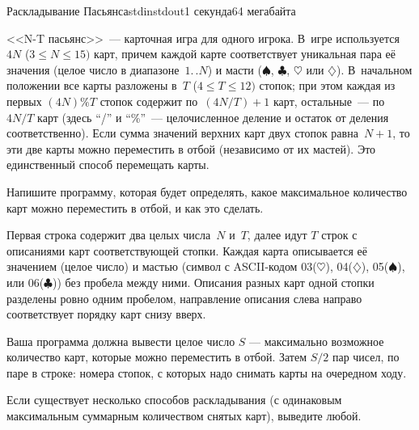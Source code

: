 \begin{problem}{Раскладывание Пасьянса}{stdin}{stdout}{1 секунда}{64 мегабайта}

<<N-T пасьянс>>~--- карточная игра для одного игрока. В~игре используется $4N$ 
($3\leqslant N\leqslant 15)$ карт, причем
каждой карте соответствует уникальная пара её значения (целое число 
в диапазоне~$1.\,.N$) и масти ($\spadesuit$, $\clubsuit$, $\heartsuit$
или $\diamondsuit$). В~начальном положении все карты разложены в~$T$ 
($4\leqslant T\leqslant 12)$ стопок; при этом каждая из первых
$(4N)\%T$ стопок содержит по~$(4N/T)+1$ карт, остальные~--- 
по~$4N/T$ карт (здесь ``/'' и ``\%''~--- целочисленное деление и 
остаток от деления соответственно). Если сумма значений верхних карт
двух стопок равна~$N+1$, то эти две карты можно переместить в отбой 
(независимо от их мастей). Это единственный способ перемещать карты.

Напишите программу, которая будет определять, какое максимальное
количество карт можно переместить в отбой, и как это сделать. 


\InputFile
Первая строка содержит два целых числа~$N$ и~$T$, далее идут $T$ строк 
с описаниями карт соответствующей стопки. Каждая карта описывается 
её значением (целое число) и мастью (символ с ASCII-кодом 03($\heartsuit$), 
04($\diamondsuit$), 05($\spadesuit$), или 06($\clubsuit$)) без пробела 
между ними. Описания разных карт одной стопки разделены ровно одним пробелом,
направление описания слева направо соответствует
порядку карт снизу вверх.


\OutputFile
Ваша программа должна вывести целое число $S$ --- максимально возможное количество карт, которые можно переместить в отбой.
Затем $S/2$ пар чисел, по паре в строке: номера стопок, с которых надо снимать карты на очередном ходу. 

\Examples

\begin{example}
%
\end{example}

\Note
Если существует несколько способов раскладывания (с одинаковым максимальным суммарным количеством снятых карт), выведите любой.

\end{problem}
